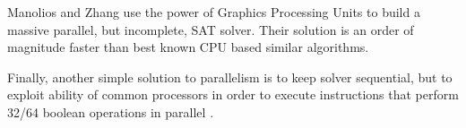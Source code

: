 Manolios and Zhang use the power of Graphics Processing
Units to build a massive parallel, but incomplete, SAT
solver\cite{Manolios_implementingsurvey}. Their solution is an order
of magnitude faster than best known CPU based similar algorithms.

Finally, another simple solution to parallelism is to keep solver
sequential, but to exploit ability of common processors in order to execute
instructions that perform 32/64 boolean operations in parallel
\cite{mine:heule_parallel}.

